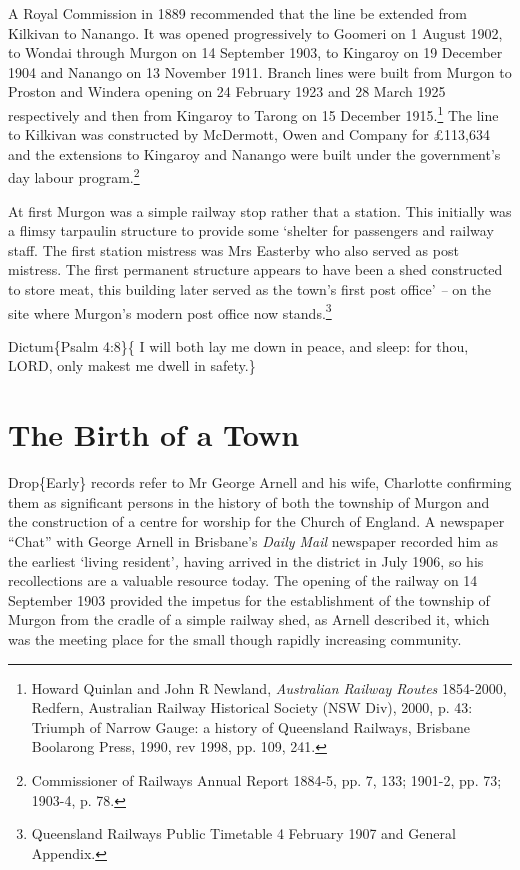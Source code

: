 A Royal Commission in 1889 recommended that the line be extended from Kilkivan to Nanango. It was opened progressively to Goomeri on 1 August 1902, to Wondai through Murgon on 14 September 1903, to Kingaroy on 19 December 1904 and Nanango on 13 November 1911. Branch lines were built from Murgon to Proston and Windera opening on 24 February 1923 and 28 March 1925 respectively and then from Kingaroy to Tarong on 15 December 1915.\footnote{Howard Quinlan and John R Newland, \emph{Australian Railway Routes} 1854-2000, Redfern, Australian Railway Historical Society (NSW Div), 2000, p. 43: Triumph of Narrow Gauge: a history of Queensland Railways, Brisbane Boolarong Press, 1990, rev 1998, pp. 109, 241.} The line to Kilkivan was constructed by McDermott, Owen and Company for £113,634 and the extensions to Kingaroy and Nanango were built under the government's day labour program.\footnote{Commissioner of Railways Annual Report 1884-5, pp. 7, 133; 1901-2, pp. 73; 1903-4, p. 78.}

At first Murgon was a simple railway stop rather that a station. This initially was a flimsy tarpaulin structure to provide some `shelter for passengers and railway staff. The first station mistress was Mrs Easterby who also served as post mistress. The first permanent structure appears to have been a shed constructed to store meat, this building later served as the town's first post office' \emph{--} on the site where Murgon's modern post office now stands.\footnote{Queensland Railways Public Timetable 4 February 1907 and General Appendix.}

Dictum\{Psalm 4:8\}\{ I will both lay me down in peace, and sleep: for thou, LORD, only makest me dwell in safety.\}

\hypertarget{the-birth-of-a-town}{%
\chapter{The Birth of a Town}\label{the-birth-of-a-town}}

Drop\{Early\} records refer to Mr George Arnell and his wife, Charlotte confirming them as significant persons in the history of both the township of Murgon and the construction of a centre for worship for the Church of England. A newspaper ``Chat'' with George Arnell in Brisbane's \emph{Daily Mail} newspaper recorded him as the earliest `living resident'\emph{,} having arrived in the district in July 1906, so his recollections are a valuable resource today. The opening of the railway on 14 September 1903 provided the impetus for the establishment of the township of Murgon from the cradle of a simple railway shed, as Arnell described it, which was the meeting place for the small though rapidly increasing community.

